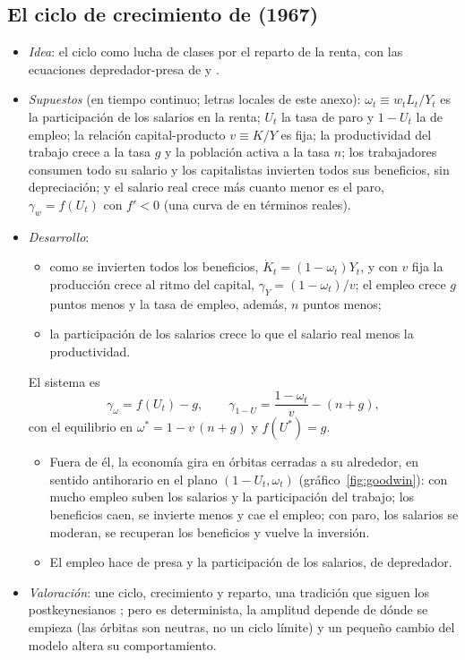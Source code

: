 \documentclass[11pt]{article}
\begin{document}
\subsection{El ciclo de crecimiento de  (1967)}

\begin{itemize}
\item \emph{Idea}: el ciclo como lucha de clases por el reparto de la renta, con las ecuaciones depredador-presa de  y \nocite{Goodwin1967Growth}.
\item \emph{Supuestos} (en tiempo continuo; letras locales de este anexo): $\omega_t\equiv w_tL_t/Y_t$ es la participación de los salarios en la renta; $U_t$ la tasa de paro y $1-U_t$ la de empleo; la relación capital-producto $v\equiv K/Y$ es fija; la productividad del trabajo crece a la tasa $g$ y la población activa a la tasa $n$; los trabajadores consumen todo su salario y los capitalistas invierten todos sus beneficios, sin depreciación; y el salario real crece más cuanto menor es el paro, $\gamma_w=f(U_t)$ con $f'<0$ (una curva de  en términos reales).
\item \emph{Desarrollo}:
  \begin{itemize}
  \item como se invierten todos los beneficios, $\dot K_t=(1-\omega_t)Y_t$, y con $v$ fija la producción crece al ritmo del capital, $\gamma_Y=(1-\omega_t)/v$; el empleo crece $g$ puntos menos y la tasa de empleo, además, $n$ puntos menos;
  \item la participación de los salarios crece lo que el salario real menos la productividad.
  \end{itemize}
  El sistema es
  \begin{equation*}
  \gamma_{\omega}=f(U_t)-g,\qquad \gamma_{1-U}=\frac{1-\omega_t}{v}-(n+g),
  \end{equation*}
  con el equilibrio en $\omega^*=1-v\,(n+g)$ y $f(U^*)=g$.
  \begin{itemize}
  \item Fuera de él, la economía gira en órbitas cerradas a su alrededor, en sentido antihorario en el plano $(1-U_t,\omega_t)$ (gráfico~\ref{fig:goodwin}): con mucho empleo suben los salarios y la participación del trabajo; los beneficios caen, se invierte menos y cae el empleo; con paro, los salarios se moderan, se recuperan los beneficios y vuelve la inversión.
  \item El empleo hace de presa y la participación de los salarios, de depredador.
  \end{itemize}
\item \emph{Valoración}: une ciclo, crecimiento y reparto, una tradición que siguen los postkeynesianos ; pero es determinista, la amplitud depende de dónde se empieza (las órbitas son neutras, no un ciclo límite) y un pequeño cambio del modelo altera su comportamiento.
\end{itemize}
\end{document}
